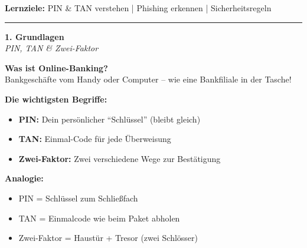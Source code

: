 \documentclass[a4paper,landscape,8pt]{extarticle}
\begin{document}

 \hfill
{\footnotesize\textbf{Lernziele:} PIN \& TAN verstehen | Phishing erkennen | Sicherheitsregeln}

\vspace{1mm}
\hrule
\vspace{1mm}

\begin{minipage}[t]{0.32\linewidth}
\begin{center}
\colorbox{bankblue!15}{%
\begin{minipage}{0.95\linewidth}
\vspace{2mm}
\begin{center}
{\Large\bfseries\textcolor{bankblue}{1. Grundlagen}}\\[1pt]
{\footnotesize\itshape PIN, TAN \& Zwei-Faktor}
\end{center}
\vspace{2mm}
\end{minipage}%
}
\end{center}

\vspace{1mm}

\textbf{Was ist Online-Banking?}\\
Bankgeschäfte vom Handy oder Computer -- wie eine Bankfiliale in der Tasche!

\textbf{Die wichtigsten Begriffe:}
\begin{itemize}
\item \textbf{PIN:} Dein persönlicher ``Schlüssel'' (bleibt gleich)
\item \textbf{TAN:} Einmal-Code für jede Überweisung
\item \textbf{Zwei-Faktor:} Zwei verschiedene Wege zur Bestätigung
\end{itemize}

\textbf{Analogie:}
\begin{itemize}
\item PIN = Schlüssel zum Schließfach
\item TAN = Einmalcode wie beim Paket abholen
\item Zwei-Faktor = Haustür + Tresor (zwei Schlösser)
\end{itemize}

\vspace{2mm}

\end{minipage}%
\end{document}
